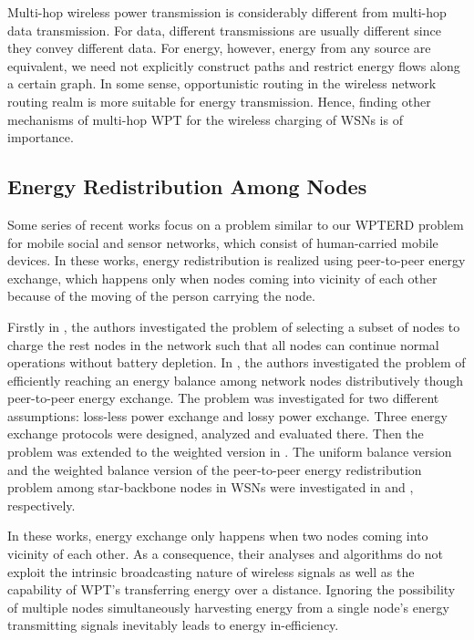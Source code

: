 \documentclass[journal,10pt]{IEEEtran}
\begin{document}
Multi-hop wireless power transmission is considerably different from multi-hop data transmission. For data, different transmissions are usually different since they convey different data. For energy, however, energy from any source are equivalent, we need not explicitly construct paths and restrict energy flows along a certain graph. In some sense, opportunistic routing in the wireless network routing realm is more suitable for energy transmission. Hence, finding other mechanisms of multi-hop WPT for the wireless charging of WSNs is of importance.

\subsection{Energy Redistribution Among Nodes}

Some series of recent works \cite{Bulut2014,Niko2016,Niko2017,Madhja2016,Madhja2017} focus on a problem similar to our WPTERD problem for mobile social and sensor networks, which consist of human-carried mobile devices. In these works, energy redistribution is realized using peer-to-peer energy exchange, which happens only when nodes coming into vicinity of each other because of the moving of the person carrying the node.

Firstly in \cite{Bulut2014}, the authors investigated the problem of selecting a subset of nodes to charge the rest nodes in the network such that all nodes can continue normal operations without battery depletion. In \cite{Niko2016}, the authors investigated the problem of efficiently reaching an energy balance among network nodes distributively though peer-to-peer energy exchange. The problem was investigated for two different assumptions: loss-less power exchange and lossy power exchange. Three energy exchange protocols were designed, analyzed and evaluated there. Then the problem was extended to the weighted version in \cite{Niko2017}. The uniform balance version and the weighted balance version of the peer-to-peer energy redistribution problem among star-backbone nodes in WSNs were investigated in \cite{Madhja2016} and \cite{Madhja2017}, respectively.

In these works, energy exchange only happens when two nodes coming into vicinity of each other. As a consequence, their analyses and algorithms do not exploit the intrinsic broadcasting nature of wireless signals as well as the capability of WPT's transferring energy over a distance. Ignoring the possibility of multiple nodes simultaneously harvesting energy from a single node's energy transmitting signals inevitably leads to energy in-efficiency.
\end{document}
